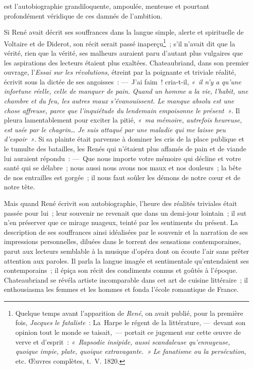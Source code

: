 \documentclass[french,twoside]{book} %
\begin{document}
\label{p585}est l’autobiographie grandiloquente, ampoulée, menteuse et pourtant profondément véridique de ces damnés de l’ambition.\par
Si René avait décrit ses souffrances dans la langue simple, alerte et spirituelle de Voltaire et de Diderot, son récit serait passé inaperçu\footnote{Quelque temps avant l’apparition de \emph{René}, on avait publié, pour la première fois, \emph{Jacques le fataliste} : La Harpe le régent de la littérature, — devant son opinion tout le monde se taisait, — portait ce jugement sur cette œuvre de verve et d’esprit : \emph{« Rapsodie insipide, aussi scandaleuse qu’ennuyeuse, quoique impie, plate, quoique extravagante. »} \emph{Le fanatisme ou la persécution}, etc. Œuvres complètes, t. V. 1820.} ; s’il n’avait dit que la vérité, rien que la vérité, ses malheurs auraient paru d’autant plus vulgaires que les aspirations des lecteurs étaient plus exaltées. Chateaubriand, dans son premier ouvrage, l’\emph{Essai sur les révolutions}, étreint par la poignante et triviale réalité, écrivit sous la dictée de ses angoisses : — J’ai faim ! cria-t-il, \emph{« il n’y a qu’une infortune réelle, celle de manquer de pain. Quand un homme a la vie, l’habit, une chambre et du feu, les autres maux s’évanouissent. Le manque absolu est une chose affreuse, parce que l’inquiétude du lendemain empoisonne le présent »}. Il pleura lamentablement pour exciter la pitié, \emph{« ma mémoire, autrefois heureuse, est usée par le chagrin… Je suis attaqué par une maladie qui me laisse peu d’espoir »}. Si sa plainte était parvenue à dominer les cris de la place publique et le tumulte des batailles, les Renés qui n’étaient plus affamés de pain et de viande lui auraient répondu : — Que nous importe votre mémoire qui décline et votre santé qui se délabre ; nous aussi nous avons nos maux et nos douleurs ; la bête de nos entrailles est gorgée ; il nous faut soûler les démons de notre cœur et de notre tête.\par
Mais quand René écrivit son autobiographie, l’heure des réalités triviales était passée pour lui ; leur souvenir ne revenait que dans un demi-jour lointain ; il sut n’en préserver que ce mirage nuageux, teinté par les sentiments du présent. La description de ses souffrances ainsi idéalisées par le souvenir et la narration de ses impressions personnelles, diluées dans le torrent des sensations contemporaines, parut aux lecteurs semblable à la musique d’opéra dont on écoute l’air sans prêter attention aux paroles. Il parla la langue imagée et sentimentale qu’entendaient ses contemporains ; il épiça son récit des condiments connus et goûtés à l’époque. Chateaubriand se révéla artiste incomparable dans cet art de cuisine littéraire ; il enthousiasma les femmes et les hommes et fonda l’école romantique de France.
\end{document}
